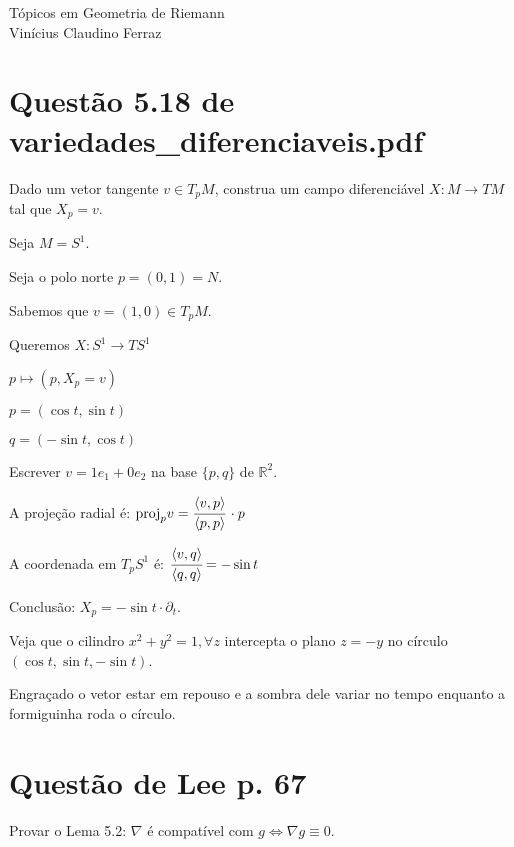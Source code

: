 \documentclass[12pt]{article}
\begin{document}
	\Large

	\begin{center}
	 T\'opicos em Geometria de Riemann \\
	 Vin\'icius Claudino Ferraz
	\end{center}

	\normalsize

	\section{Quest\~ao 5.18 de variedades\_diferenciaveis.pdf}
		\begin{flushright}
		\end{flushright}

		Dado um vetor tangente $v \in T_pM$, construa um campo diferenci\'avel $X: M \rightarrow TM$ tal que $X_p = v$.

		Seja $M = S^1$.

		Seja o polo norte $p = (0,1) = N$.

		Sabemos que $v = (1, 0) \in T_pM$.

		Queremos $X : S^1 \rightarrow TS^1$

		$p \mapsto (p, X_p = v)$

		$p = (\cos t, \sin t)$

		$q = (-\sin t, \cos t)$

		Escrever $v = 1 e_1 + 0 e_2$ na base $\{ p, q \}$ de $\mathbb{R}^2$.

		A proje\c{c}\~ao radial \'e: $\text{proj}_p v = \cfrac{\langle v, p \rangle}{\langle p, p \rangle}\,\cdot p$

		A coordenada em $T_pS^1$ \'e: $\cfrac{\langle v, q \rangle}{\langle q, q \rangle} = - \sin t$

		Conclus\~ao: $X_p = - \sin t \cdot \partial_t$.

		Veja que o cilindro $x^2 + y^2 = 1, \forall z$ intercepta o plano $z = -y$ no c\'irculo $(\cos t, \sin t, -\sin t)$.

		Engra\c{c}ado o vetor estar em repouso e a sombra dele variar no tempo enquanto a formiguinha roda o c\'irculo.

	\section{Quest\~ao de Lee p. 67}
		\begin{flushright}
		\end{flushright}

		Provar o Lema 5.2: $\nabla$ \'e compat\'ivel com $g \Leftrightarrow \nabla g \equiv 0$.
\end{document}
